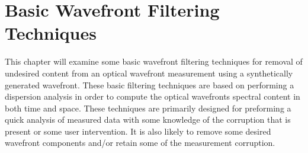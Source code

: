 

\chapter{Basic Wavefront Filtering Techniques}
\label{chap:wavefront_filtering}
This chapter will examine some basic wavefront filtering techniques for removal of undesired content from an optical wavefront measurement using a synthetically generated wavefront.
These basic filtering techniques are based on performing a dispersion analysis in order to compute the optical wavefronts spectral content in both time and space.
These techniques are primarily designed for preforming a quick analysis of measured data with some knowledge of the corruption that is present or some user intervention.
It is also likely to remove some desired wavefront components and/or retain some of the measurement corruption.

